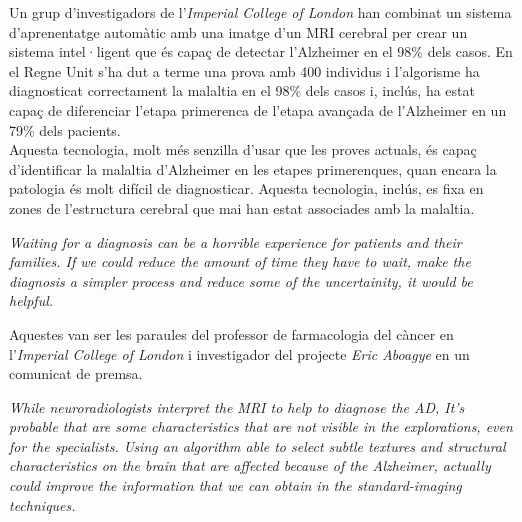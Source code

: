 \documentclass[a4paper,12pt]{article}
\begin{document}
\begin{center}
    \begin{minipage}{0.9\linewidth}
        \vspace{5pt}
        {\small
            Un grup d'investigadors de l'\textit{Imperial College of London} han combinat un sistema d'aprenentatge automàtic amb una imatge d'un MRI cerebral per crear un sistema intel·ligent que és capaç de detectar l'Alzheimer en el 98\% dels casos. En el Regne Unit s'ha dut a terme una prova amb 400 individus i l'algorisme ha diagnosticat correctament la malaltia en el 98\% dels casos i, inclús, ha estat capaç de diferenciar l'etapa primerenca de l'etapa avançada de l'Alzheimer en un 79\% dels pacients.\\
            Aquesta tecnologia, molt més senzilla d'usar que les proves actuals, és capaç d'identificar la malaltia d'Alzheimer en les etapes primerenques, quan encara la patologia és molt difícil de diagnosticar. Aquesta tecnologia, inclús, es fixa en zones de l'estructura cerebral que mai han estat associades amb la malaltia.\\
            \begin{center}
                \begin{minipage}{0.9\linewidth}
                    \vspace{5pt}
                    {\small \textit{Waiting for a diagnosis can be a horrible experience for patients and their families. If we could reduce the amount of time they have to wait, make the diagnosis a simpler process and reduce some of the uncertainity, it would be helpful.}
                    }
                    \vspace{20pt}
                \end{minipage}
            \end{center}
            Aquestes van ser les paraules del professor de farmacologia del càncer en l'\textit{Imperial College of London} i investigador del projecte \textit{Eric Aboagye} en un comunicat de premsa.\\
            \begin{center}
                \begin{minipage}{0.9\linewidth}
                    \vspace{5pt}
                    {\small \textit{While neuroradiologists interpret the MRI to help to diagnose the AD, It's probable that are some characteristics that are not visible in the explorations, even for the specialists. Using an algorithm able to select subtle textures and structural characteristics on the brain that are affected because of the Alzheimer, actually could improve the information that we can obtain in the standard-imaging techniques.}
}
\end{minipage}
\end{center}}
\end{minipage}
\end{center}
\end{document}
